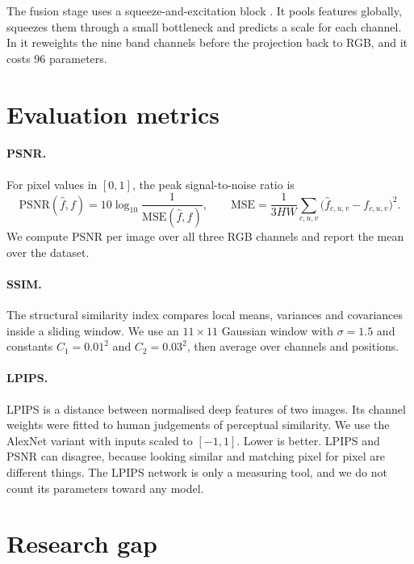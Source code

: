 The fusion stage uses a squeeze-and-excitation block \cite{hu2018se}. It pools
features globally, squeezes them through a small bottleneck and predicts a
scale for each channel. In \fcsg{} it reweights the nine band channels before
the projection back to RGB, and it costs 96 parameters.

\section{Evaluation metrics}\label{sec:lit-metrics}

\paragraph{PSNR.} For pixel values in $[0,1]$, the peak signal-to-noise
ratio is
\begin{equation}
	\mathrm{PSNR}(\hat f, f) = 10\log_{10}\frac{1}{\mathrm{MSE}(\hat f, f)},
	\qquad
	\mathrm{MSE} = \frac{1}{3HW}\sum_{c,u,v}\big(\hat f_{c,u,v} - f_{c,u,v}\big)^2 .
	\label{eq:psnr}
\end{equation}
We compute PSNR per image over all three RGB channels and report the mean
over the dataset.

\paragraph{SSIM.} The structural similarity index \cite{wang2004ssim}
compares local means, variances and covariances inside a sliding window. We
use an $11\times11$ Gaussian window with $\sigma=1.5$ and constants
$C_1=0.01^2$ and $C_2=0.03^2$, then average over channels and positions.

\paragraph{LPIPS.} LPIPS \cite{zhang2018lpips} is a distance between
normalised deep features of two images. Its channel weights were fitted to
human judgements of perceptual similarity. We use the AlexNet variant with
inputs scaled to $[-1,1]$. Lower is better. LPIPS and PSNR can disagree,
because looking similar and matching pixel for pixel are different things.
The LPIPS network is only a measuring tool, and we do not count its
parameters toward any model.

\section{Research gap}\label{sec:gap}

